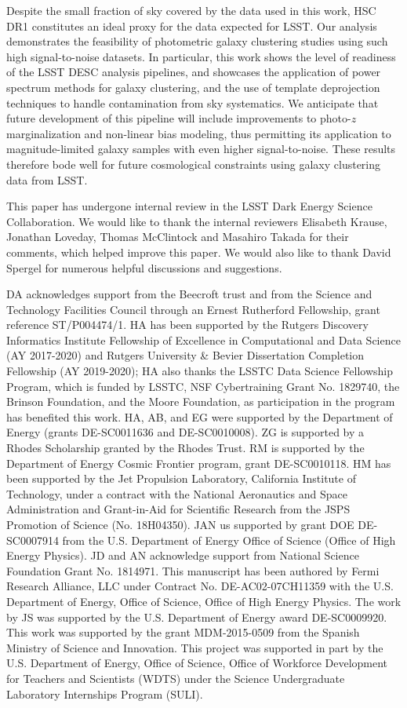 \documentclass[a4paper,11pt]{article}
\begin{document}
  Despite the small fraction of sky covered by the data used in this work, HSC DR1 constitutes an ideal proxy for the data expected for LSST. Our analysis demonstrates the feasibility of photometric galaxy clustering studies using such high signal-to-noise datasets. In particular, this work shows the level of readiness of the LSST DESC analysis pipelines, and showcases the application of power spectrum methods for galaxy clustering, and the use of template deprojection techniques to handle contamination from sky systematics. We anticipate that future development of this pipeline will include improvements to photo-$z$ marginalization and non-linear bias modeling, thus permitting its application to magnitude-limited galaxy samples with even higher signal-to-noise. These results therefore bode well for future cosmological constraints using galaxy clustering data from LSST.


\acknowledgments
  This paper has undergone internal review in the LSST Dark Energy Science Collaboration. 
  We would like to thank the internal reviewers Elisabeth Krause, Jonathan Loveday, Thomas McClintock and Masahiro Takada for their comments, which helped improve this paper. We would also like to thank David Spergel for numerous helpful discussions and suggestions.

  DA acknowledges support from the Beecroft trust and from the Science and Technology Facilities Council through an Ernest Rutherford Fellowship, grant reference ST/P004474/1.
  HA has been supported by the Rutgers Discovery Informatics Institute Fellowship of Excellence in Computational and Data Science (AY 2017-2020) and Rutgers University \& Bevier Dissertation Completion Fellowship (AY 2019-2020); HA also thanks the LSSTC Data Science Fellowship Program, which is funded by LSSTC, NSF Cybertraining Grant No. 1829740, the Brinson Foundation, and the Moore Foundation, as participation in the program has benefited this work. HA, AB, and EG were supported by the Department of Energy (grants DE-SC0011636 and DE-SC0010008).
  ZG is supported by a Rhodes Scholarship granted by the Rhodes Trust.
  RM is supported by the Department of Energy Cosmic Frontier program, grant DE-SC0010118.
  HM has been supported by the Jet Propulsion Laboratory, California Institute of Technology, under a contract with the National Aeronautics and Space Administration and Grant-in-Aid for Scientific Research from the JSPS Promotion of Science (No. 18H04350). 
  JAN us supported by grant DOE DE-SC0007914 from the U.S. Department of Energy Office of Science (Office of High Energy Physics).
  JD and AN acknowledge support from National Science Foundation Grant No. 1814971.
  This manuscript has been authored by Fermi Research Alliance, LLC under Contract No. DE-AC02-07CH11359 with the U.S. Department of Energy, Office of Science, Office of High Energy Physics.
  The work by JS was supported by the U.S. Department of Energy award DE-SC0009920.
  This work was supported by the grant MDM-2015-0509 from the Spanish Ministry of Science and Innovation.
  This project was supported in part by the U.S. Department of Energy, Office of Science, Office of Workforce Development for Teachers and Scientists (WDTS) under the Science Undergraduate Laboratory Internships Program (SULI).
\end{document}
